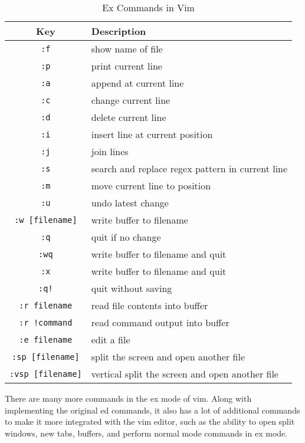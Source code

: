 \begin{table*}[h!]
  \caption{Ex Commands in Vim}
  \begin{tabular}{c l}
    \toprule
    Key & Description \\
    \midrule
    \lstinline|:f| & show name of file \\
    \lstinline|:p| & print current line \\
    \lstinline|:a| & append at current line \\
    \lstinline|:c| & change current line \\
    \lstinline|:d| & delete current line \\
    \lstinline|:i| & insert line at current position \\
    \lstinline|:j| & join lines \\
    \lstinline|:s| & search and replace regex pattern in current line \\
    \lstinline|:m| & move current line to position \\
    \lstinline|:u| & undo latest change \\
    \lstinline|:w [filename]| & write buffer to filename \\
    \lstinline|:q| & quit if no change \\
    \lstinline|:wq| & write buffer to filename and quit \\
    \lstinline|:x| & write buffer to filename and quit \\
    \lstinline|:q!| & quit without saving \\
    \lstinline|:r filename| & read file contents into buffer \\
    \lstinline|:r !command| & read command output into buffer \\
    \lstinline|:e filename| & edit a file \\
    \lstinline|:sp [filename]| & split the screen and open another file \\
    \lstinline|:vsp [filename]| & vertical split the screen and open another file \\
    \bottomrule
  \end{tabular}
\end{table*}

There are many more commands in the ex mode of vim.
Along with implementing the original ed commands, it
also has a lot of additional commands to make it more
integrated with the vim editor, such as the ability
to open split windows, new tabs, buffers, and perform
normal mode commands in ex mode.

